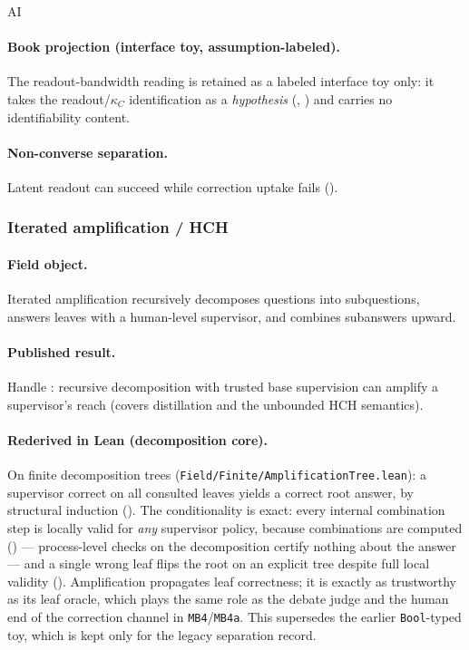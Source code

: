 \begin{authbar}{AI}
\paragraph{Book projection (interface toy, assumption-labeled).}
The readout-bandwidth reading is retained as a labeled interface toy only: it takes the readout/\(\kappa_C\) identification as a \emph{hypothesis} (, ) and carries no identifiability content.

\paragraph{Non-converse separation.}
Latent readout can succeed while correction uptake fails ().

\subsubsection{Iterated amplification / HCH \autocite{christiano2018amplifying}}
\label{sec:appi-field-amplification}

\paragraph{Field object.}
Iterated amplification recursively decomposes questions into subquestions, answers leaves with a human-level supervisor, and combines subanswers upward.

\paragraph{Published result.}
Handle : recursive decomposition with trusted base supervision can amplify a supervisor's reach \autocite{christiano2018amplifying} (covers distillation and the unbounded HCH semantics).

\paragraph{Rederived in Lean (decomposition core).}
On finite decomposition trees (\texttt{Field/Finite/AmplificationTree.lean}): a supervisor correct on all consulted leaves yields a correct root answer, by structural induction ().
The conditionality is exact: every internal combination step is locally valid for \emph{any} supervisor policy, because combinations are computed () --- process-level checks on the decomposition certify nothing about the answer --- and a single wrong leaf flips the root on an explicit tree despite full local validity ().
Amplification propagates leaf correctness; it is exactly as trustworthy as its leaf oracle, which plays the same role as the debate judge and the human end of the correction channel in \texttt{MB4}/\texttt{MB4a}.
This supersedes the earlier \texttt{Bool}-typed  toy, which is kept only for the legacy separation record.

\end{authbar}
\authbarsubneedspace
